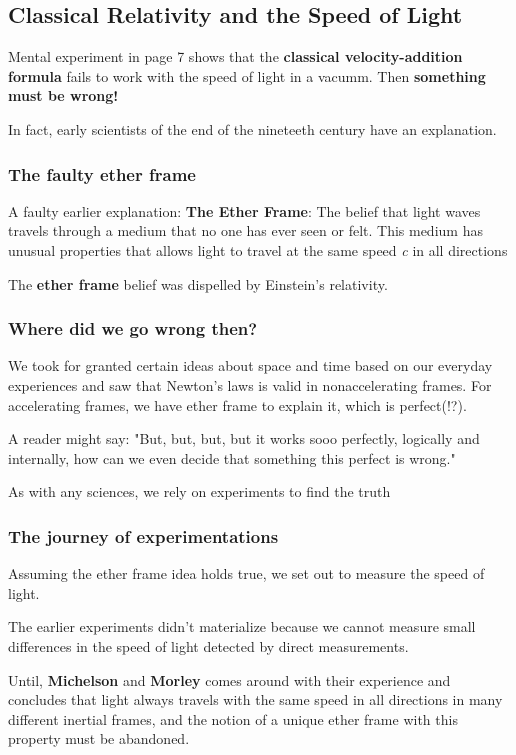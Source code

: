 \subsection{Classical Relativity and the Speed of Light}

Mental experiment in page 7 shows that the \textbf{classical velocity-addition formula} fails to work with the speed of light in a vacumm. Then \textbf{something must be wrong!}

In fact, early scientists of the end of the nineteeth century have an explanation.

\subsubsection{The faulty ether frame}
A faulty earlier explanation: \textbf{The Ether Frame}: The belief that light waves travels through a medium that no one has ever seen or felt. This medium has unusual properties that allows light to travel at the same speed \textit{c} in all directions

The \textbf{ether frame} belief was dispelled by Einstein's relativity.

\subsubsection{Where did we go wrong then?}
We took for granted certain ideas about space and time based on our everyday experiences and saw that Newton's laws is valid in nonaccelerating frames. For accelerating frames, we have ether frame to explain it, which is perfect(!?).

A reader might say: "But, but, but, but it works sooo perfectly, logically and internally, how can we even decide that something this perfect is wrong."

As with any sciences, we rely on experiments to find the truth

\subsubsection{The journey of experimentations}

Assuming the ether frame idea holds true, we set out to measure the speed of light. 

The earlier experiments didn't materialize because we cannot measure small differences in the speed of light detected by direct measurements.

Until, \textbf{Michelson} and \textbf{Morley} comes around with their experience and concludes that light always travels with the same speed in all directions in many different inertial frames, and the notion of a unique ether frame with this property must be abandoned.
